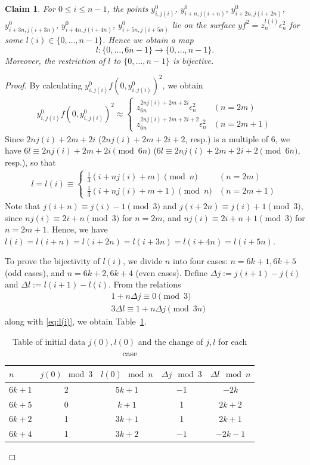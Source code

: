 \documentclass[10pt,a4paper,reqno]{amsart}
\newtheorem{claim}[thm]{Claim}
\theoremstyle{definition}
\numberwithin{equation}{section}
\numberwithin{figure}{section}
\newcommand{\ep}{\epsilon}
\newcommand{\arrowr}{\rightarrow}
\begin{document}
\begin{claim} \label{claim:subsurface2}
For $0\le i \le n-1$, 
the points $y^0_{i,j(i)}$, $y^0_{i+n,j(i+n)}$, $y^0_{i+2n,j(i+2n)}$, $y^0_{i+3n,j(i+3n)}$, $y^0_{i+4n,j(i+4n)}$, $y^0_{i+5n,j(i+5n)}$
lie on the surface $yf^2=z_{n}^{l(i)} {\ep_n^{2}}$ for some $l(i)\in \{0,\dots, n-1\}$.
Hence we obtain a map \[l:\{0,\dots, 6n-1\} \arrowr \{0,\dots,n-1\}.\]
Moreover, the restriction of $l$ to $\{0,\dots, n-1\}$ is bijective.
\end{claim}

\begin{proof}
By calculating $y^0_{i,j(i)}f(0,y^0_{i,j(i)})^2$, we obtain
\begin{align*}
y^0_{i,j(i)}f(0,y^0_{i,j(i)})^2 \approx 
\begin{cases} z_{6n}^{2nj(i)+2m+2i}{\ep_n^{2}} & (n=2m ) \\
z_{6n}^{2nj(i)+2m+2i+2}{\ep_n^{2}} & (n=2m+1) \end{cases} \end{align*}
Since $2nj(i)+2m+2i$ ($2nj(i)+2m+2i+2$, resp.) is a multiple of 6, we have $6l \equiv 2nj(i)+2m+2i \pmod{6n}$ ($6l \equiv 2nj(i)+2m+2i+2 \pmod{6n}$, resp.), so that
\begin{align} \label{eq:l(i)}
l=l(i)\equiv \begin{cases} \frac{1}{3}(i+nj(i)+m) \pmod{n} & (n=2m) \\ \frac{1}{3}(i+nj(i)+m+1) \pmod{n}& (n=2m+1) \end{cases}
\end{align}
Note that $j(i+n)\equiv j(i)-1 \pmod{3}$ and $j(i+2n) \equiv j(i)+1 \pmod{3}$, since
$nj(i)\equiv 2i+n \pmod{3}$ for $n=2m$, and $nj(i) \equiv 2i+n+1 \pmod 3$ for $n=2m+1$.
Hence, we have $l(i)=l(i+n)=l(i+2n)=l(i+3n)=l(i+4n)=l(i+5n)$.

To prove the bijectivity of $l(i)$, we divide $n$ into four cases: $n=6k+1, 6k+5$ (odd cases), and $n=6k+2, 6k+4$ (even cases).
Define $\Delta j:=j(i+1)-j(i)$ and $\Delta l:= l(i+1)-l(i)$.
From the relations
\begin{align*}
&1+n \Delta j \equiv 0 \pmod{3} \\
&3\Delta l \equiv 1 +n\Delta j \pmod{3n}
\end{align*}
along with \eqref{eq:l(i)}, we obtain Table~\ref{tab:data}.
\begin{table}[ht] 
\centering
\begin{tabular}[t]{lcc|cc}
\hline
$n$		&$j(0) \mod3$	&$l(0)\mod n$	& $\Delta j \mod3$ 	&$\Delta l \mod n$\\
\hline
$6k+1$	& 2			&$5k+1$		&$-1$			&$-2k$		\\
$6k+5$	& 0			&$k+1$		&1				&$2k+2$		\\
\hline
$6k+2$	&1			&$3k+1$		&1				&$2k+1$		\\
$6k+4$	&1	 		&$3k+2$		&$-1$			&$-2k-1$		\\
\hline
\end{tabular}
\caption{Table of initial data $j(0), l(0)$ and the change of $j, l$ for each case}
\label{tab:data}
\end{table}


\end{proof}
\end{document}
